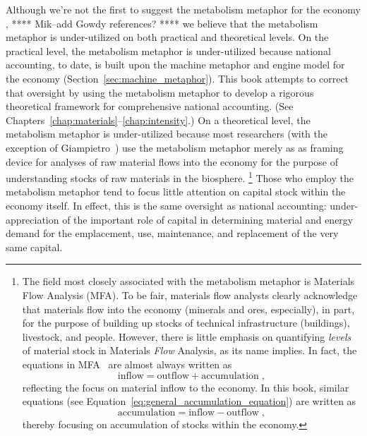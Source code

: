 Although we're not the first to suggest the metabolism metaphor for the economy
\cite{Liu2012, Giampietro2000, Giampietro2013, F-K1999, F-K2003, Heijman:1988aa},
**** Mik--add Gowdy references? ****
we believe that
the metabolism metaphor is under-utilized 
on both practical and theoretical levels.
On the practical level, the metabolism metaphor is under-utilized
because national accounting, to date, 
is built upon the machine metaphor and engine model for the economy
(Section~\ref{sec:machine_metaphor}).
This book attempts to correct that oversight 
by using the metabolism metaphor 
to develop a rigorous theoretical framework 
for comprehensive national accounting.
(See Chapters~\ref{chap:materials}--\ref{chap:intensity}.)
On a theoretical level, the metabolism metaphor is under-utilized because 
most researchers (with the exception of Giampietro~\cite{Giampietro2000, Giampietro2013})
use the metabolism metaphor merely as as framing device for analyses of
raw material flows into the economy for the purpose of understanding 
stocks of raw materials in the biosphere.%
	\footnote{The field most closely associated with the metabolism metaphor is
	Materials Flow Analysis (MFA). 
	To be fair, materials flow analysts clearly acknowledge that 
	materials flow into the economy (minerals and ores, especially),
	in part,
	for the purpose of building up stocks of technical infrastructure (buildings),
	livestock, and people.\cite[p.~116]{F-K1999} 
	However, there is little emphasis on quantifying \emph{levels} 
	of material stock in Materials \emph{Flow} Analysis, 
	as its name implies.
	In fact, the equations in MFA~\cite[Equation~1]{F-K1999} are almost always written as%
	\begin{equation*}
		\mathrm{inflow} = \mathrm{outflow} + \mathrm{accumulation \; ,}
	\end{equation*}
	reflecting the focus on material inflow to the economy.
	In this book, similar equations 
	(see Equation~\ref{eq:general_accumulation_equation}) 
	are written as%
	\begin{equation*}
		\mathrm{accumulation} = \mathrm{inflow} - \mathrm{outflow \; ,}
	\end{equation*}
	thereby focusing on accumulation of stocks within the economy.
	}
Those who employ the metabolism metaphor
tend to focus little attention on capital stock within the economy itself.
In effect, this is the same oversight as national accounting: 
under-appreciation of the important role of capital
in determining material and energy demand 
for the emplacement, use, maintenance, and replacement of the very same capital.

